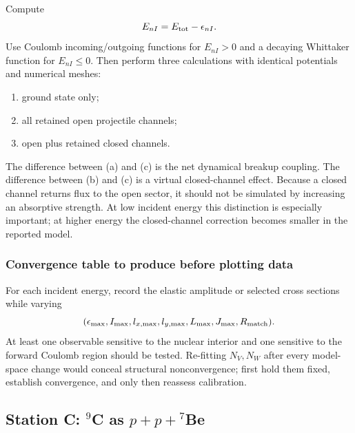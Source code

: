 Compute
\begin{equation}
  E_{nI}=E_{\mathrm{tot}}-\epsilon_{nI}.
  \label{eq:li6-channel-energy}
\end{equation}
Use Coulomb incoming/outgoing functions for $E_{nI}>0$ and a decaying
Whittaker function for $E_{nI}\leq0$.  Then perform three calculations with
identical potentials and numerical meshes:
\begin{enumerate}[label=(\alph*)]
  \item ground state only;
  \item all retained open projectile channels;
  \item open plus retained closed channels.
\end{enumerate}
The difference between (a) and (c) is the net dynamical breakup coupling.  The
difference between (b) and (c) is a virtual closed-channel effect.  Because a
closed channel returns flux to the open sector, it should not be simulated by
increasing an absorptive strength.  At low incident energy this distinction is
especially important; at higher energy the closed-channel correction becomes
smaller in the reported model.

\subsubsection{Convergence table to produce before plotting data}

For each incident energy, record the elastic amplitude or selected cross
sections while varying
\begin{equation}
  (\epsilon_{\max},I_{\max},l_{x,\max},l_{y,\max},
    L_{\max},J_{\max},R_{\mathrm{match}}).
  \label{eq:li6-cutoff-vector}
\end{equation}
At least one observable sensitive to the nuclear interior and one sensitive
to the forward Coulomb region should be tested.  Re-fitting $N_V,N_W$ after
every model-space change would conceal structural nonconvergence; first hold
them fixed, establish convergence, and only then reassess calibration.

\subsection{Station C: \texorpdfstring{$^9$C as $p+p+{}^7$Be}
{9C as p+p+7Be}}
\label{subsec:lab-9c-structure}

